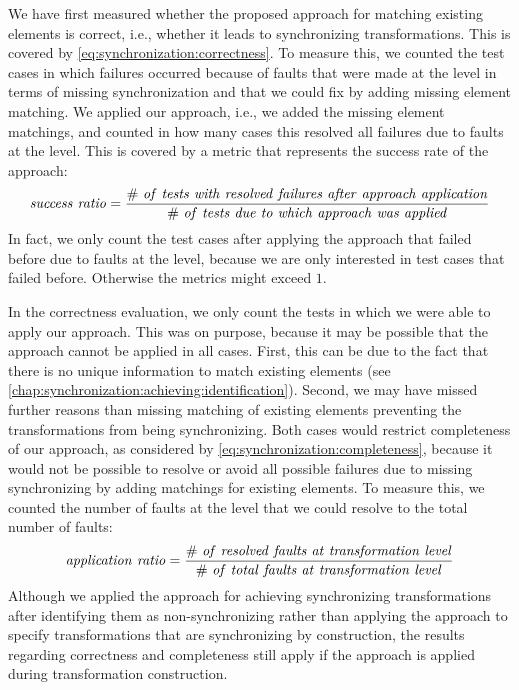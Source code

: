 We have first measured whether the proposed approach for matching existing elements is correct, i.e., whether it leads to synchronizing transformations. This is covered by \autoref{eq:synchronization:correctness}.
To measure this, we counted the test cases in which failures occurred because of faults that were made at the \leveltransformation level in terms of missing synchronization and that we could fix by adding missing element matching.
We applied our approach, i.e., we added the missing element matchings, and counted in how many cases this resolved all failures due to faults at the \leveltransformation level.
This is covered by a metric that represents the success rate of the approach:
\begin{align*}
    \mathvariable{success\ ratio} = \frac{\mathvariable{\#\ of\ tests\ with\ resolved\ failures\ after\ approach\ application}}{\mathvariable{\#\ of\ tests\ due\ to\ which\ approach\ was\ applied}}
\end{align*}
In fact, we only count the test cases after applying the approach that failed before due to faults at the \leveltransformation level, because we are only interested in test cases that failed before. Otherwise the metrics might exceed $1$.

In the correctness evaluation, we only count the tests in which we were able to apply our approach.
This was on purpose, because it may be possible that the approach cannot be applied in all cases.
First, this can be due to the fact that there is no unique information to match existing elements (see \autoref{chap:synchronization:achieving:identification}).
Second, we may have missed further reasons than missing matching of existing elements preventing the transformations from being synchronizing.
Both cases would restrict completeness of our approach, as considered by \autoref{eq:synchronization:completeness}, because it would not be possible to resolve or avoid all possible failures due to missing synchronizing by adding matchings for existing elements.
To measure this, we counted the number of faults at the \leveltransformation level that we could resolve to the total number of faults:
\begin{align*}
    \mathvariable{application\ ratio} = \frac{\mathvariable{\#\ of\ resolved\ faults\ at\ \leveltransformation\ level}}{\mathvariable{\#\ of\ total\ faults\ at\ \leveltransformation\ level}}
\end{align*}
Although we applied the approach for achieving synchronizing transformations after identifying them as non-synchronizing rather than applying the approach to specify transformations that are synchronizing by construction, the results regarding correctness and completeness still apply if the approach is applied during transformation construction.


